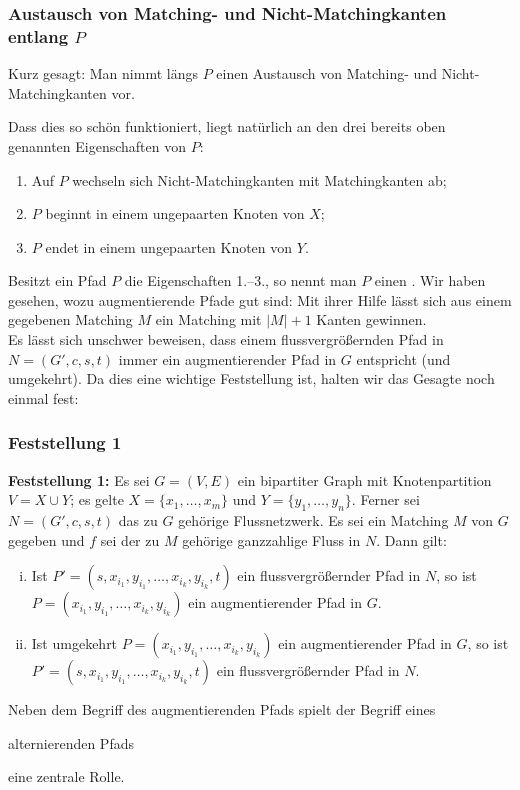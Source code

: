 \documentclass[smaller]{beamer}
\begin{document}
\begin{frame}
 \frametitle{Austausch von Matching- und Nicht-Matchingkanten entlang $P$}
 Kurz gesagt: \alert{Man nimmt längs $P$ einen Austausch von Matching- und Nicht-Matchingkanten vor}. \\ \vspace*{0.2cm}

Dass dies so schön funktioniert, liegt natürlich an den drei bereits oben genannten Eigenschaften von $P$:

\begin{enumerate}[1.]
\item Auf $P$ wechseln sich Nicht-Matchingkanten mit Matchingkanten ab;
\item $P$ beginnt in einem ungepaarten Knoten von $X$; 
\item $P$ endet in einem ungepaarten Knoten von $Y$.
\end{enumerate}

Besitzt ein Pfad $P$ die Eigenschaften 1.--3., so nennt man $P$ einen \label{page:11:3}. Wir haben gesehen, wozu augmentierende Pfade gut sind: \alert{Mit ihrer Hilfe lässt sich aus einem gegebenen Matching $M$ ein Matching mit $|M|+1$ Kanten gewinnen.} \\ \vspace*{0.2cm}
Es lässt sich unschwer beweisen, dass einem flussvergrößernden Pfad in $N=(G',c,s,t)$ immer ein augmentierender Pfad in $G$ entspricht (und umgekehrt). Da dies eine wichtige Feststellung ist, halten wir das Gesagte noch einmal fest:
\end{frame}

\begin{frame}
 \frametitle{Feststellung 1}
 \textbf{Feststellung 1:} Es sei $G=(V,E)$ ein bipartiter Graph mit Knotenpartition $V = X \cup Y$; es gelte $X=\big\{ x_1,\ldots,x_m\big\}$ und $Y = \big\{ y_1,\ldots,y_n \big\}$. Ferner sei $N=(G',c,s,t)$ das zu $G$ gehörige Flussnetzwerk. Es sei ein Matching $M$ von $G$ gegeben und $f$ sei der zu $M$ gehörige ganzzahlige Fluss in $N$. Dann gilt:
\begin{enumerate}[i)]
\item Ist $P' = (s,x_{i_1},y_{i_1},\ldots,x_{i_k},y_{i_k},t)$ ein flussvergrößernder Pfad in $N$, so ist $P = (x_{i_1},y_{i_1},\ldots,x_{i_k},y_{i_k})$ ein augmentierender Pfad in $G$.
\item Ist umgekehrt $P = (x_{i_1},y_{i_1},\ldots,x_{i_k},y_{i_k})$ ein augmentierender Pfad in $G$, so ist $P' = (s,x_{i_1},y_{i_1},\ldots,x_{i_k},y_{i_k},t)$ ein flussvergrößernder Pfad in $N$.
\end{enumerate} \vspace*{0.2cm}
Neben dem Begriff des augmentierenden Pfads spielt der Begriff eines
\begin{center}
	\alert{alternierenden Pfads}
\end{center}
eine zentrale Rolle.
\end{frame}
\end{document}
